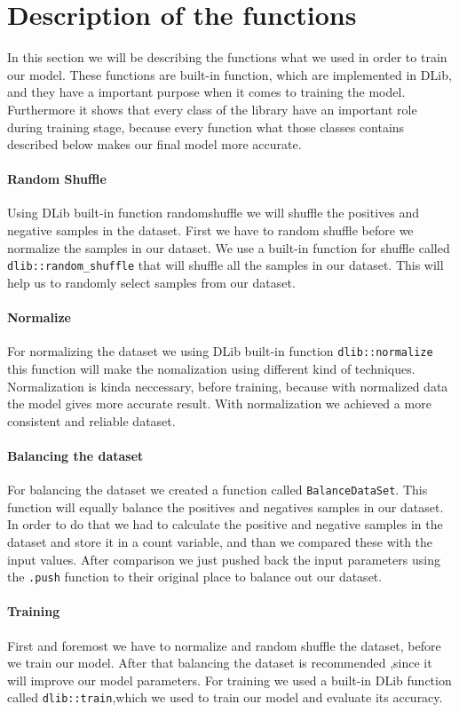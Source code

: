 \documentclass[english,12pt,oneside,a4paper]{article}
\begin{document}
		\section{Description of the functions}
		In this section we will be describing the functions what we used in order to train our model. These functions are built-in function, which are implemented in DLib, and they have a important purpose when it comes to training the model. Furthermore it shows that every class of the library have an important role during training stage, because every function what those classes contains described below makes our final model more accurate. 
		
		\paragraph{Random Shuffle}
		Using DLib built-in function randomshuffle we will shuffle the positives and negative samples in the dataset.
		First we have to random shuffle before we normalize the samples in our dataset. We use a built-in function for shuffle called \verb|dlib::random_shuffle| that will shuffle all the samples in our dataset. This will help us to randomly select samples from our dataset.
		\paragraph{Normalize}
		For normalizing the dataset we using DLib built-in function \verb|dlib::normalize| this function will make the nomalization using different kind of techniques.
		Normalization is kinda neccessary, before training, because with normalized data the model gives more accurate result. With normalization we achieved a more consistent and reliable dataset.
		\paragraph{Balancing the dataset}
		For balancing the dataset we created a function called \verb|BalanceDataSet|. This function will equally balance the positives and negatives samples in our dataset. In order to do that we had to calculate the positive and negative samples in the dataset and store it in a count variable, and than we compared these with the input values. After comparison we just pushed back the input parameters using the  \verb|.push| function to their original place to balance out our dataset. 
		\paragraph{Training}
		 First and foremost we have to normalize and random shuffle the dataset, before we train our model. After that balancing the dataset is recommended ,since it will improve our model parameters. For training we used a built-in DLib function called \verb|dlib::train|,which we used to train our model and evaluate its accuracy.
\end{document}
